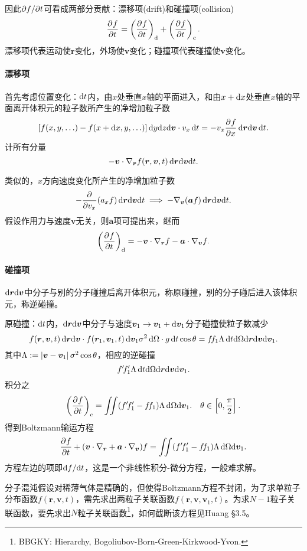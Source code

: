 因此$\p f/\p t$可看成两部分贡献：漂移项(drift)和碰撞项(collision)
\begin{align}
	\pv ft=\kh{\pv ft}_\df+\kh{\pv ft}_\cll.
\end{align}
漂移项代表运动使$\bm r$变化，外场使$\bm v$变化；碰撞项代表碰撞使$\bm v$变化。
\paragraph{漂移项}首先考虑位置变化：$\d t$内，由$x$处垂直$x$轴的平面进入，和由$x+\d x$处垂直$x$轴的平面离开体积元的粒子数所产生的净增加粒子数
\[
	\fkh{f(x,y,\ldots)-f(x+\d x,y,\ldots)}\d y\nd z\nd\bm v\cdot v_x\d t=-v_x\pv fx\d\bm r\nd\bm v\d t.
\]
计所有分量
\[
	-\bm v\cdot\nabla_{\bm r}f(\bm r,\bm v,t)\d\bm r\nd\bm v\nd t.
\]

类似的，$x$方向速度变化所产生的净增加粒子数
\[
	-\pp{v_x}(a_xf)\d\bm r\nd\bm v\nd t\implies-\nabla_{\bm v}(\bm af)\d\bm r\nd\bm v\nd t.
\]
假设作用力与速度$\bm v$无关，则$\bm a$项可提出来，继而
\begin{align}
	\kh{\pv ft}_\df=-\bm v\cdot\nabla_{\bm r}f-\bm a\cdot\nabla_{\bm v}f.
\end{align}
\paragraph{碰撞项}$\d\bm r\nd\bm v$中分子与别的分子碰撞后离开体积元，称原碰撞，别的分子碰后进入该体积元，称逆碰撞。

原碰撞：$\d t$内，$\d\bm r\nd\bm v$中分子与速度$\bm v_1\to\bm v_1+\d\bm v_1$分子碰撞使粒子数减少
\[
	f(\bm r,\bm v,t)\d\bm r\nd\bm v\cdot f(\bm r_1,\bm v_1,t)\d\bm v_1\sigma^2\d\Omega\cdot g\d t\cos\theta=f\!f_1\Lambda\d t\nd\Omega\nd\bm r\nd\bm v\nd\bm v_1.
\]
其中$\Lambda:=\abs{\bm v-\bm v_1}\sigma^2\cos\theta$，相应的逆碰撞
\[
	f'\!f_1'\Lambda\d t\nd\Omega\nd\bm r\nd\bm v\nd\bm v_1.
\]
积分之
\begin{align}
	\kh{\pv ft}_\cll=\iint(f'\!f_1'-f\!f_1)\Lambda\d\Omega\nd\bm v_1.\quad\theta\in\fkh{0,\frac\pi{2}}.
\end{align}
得到Boltzmann输运方程
\begin{align}
	\pv ft+(\bm v\cdot\nabla_{\bm r}+\bm a\cdot\nabla_{\bm v})f=\iint(f'\!f_1'-f\!f_1)\Lambda\d\Omega\nd\bm v_1.
\end{align}
方程左边的项即$\d f/\nd t$，这是一个非线性积分-微分方程，一般难求解。

分子混沌假设对稀薄气体是精确的，但使得Boltzmann方程不封闭，为了求单粒子分布函数$f(\bm r,\bm v,t)$，需先求出两粒子关联函数$f(\bm r,\bm v,\bm v_1,t)$。为求$N-1$粒子关联函数，要先求出$N$粒子关联函数\footnote{BBGKY: Hierarchy, Bogoliubov-Born-Green-Kirkwood-Yvon.}，如何截断该方程见Huang \S 3.5。
